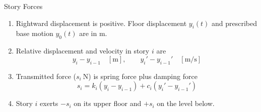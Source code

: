 \begin{frame}{Story Forces}
\begin{enumerate}
  \item Rightward displacement is positive. Floor displacement $y_i(t)$ and prescribed base motion $y_0(t)$ are in $\mathrm{m}$.
  \item Relative displacement and velocity in story $i$ are
  \[
    y_i-y_{i-1}\quad[\mathrm{m}],\qquad y_i'-y_{i-1}'\quad[\mathrm{m/s}]
  \]
  \item Transmitted force ($s_i\ \mathrm{N}$) is spring force plus damping force
  \[
    s_i=k_i(y_i-y_{i-1})+c_i(y_i'-y_{i-1}')
  \]
  \item Story $i$ exerts $-s_i$ on its upper floor and $+s_i$ on the level below.
\end{enumerate}
\end{frame}

